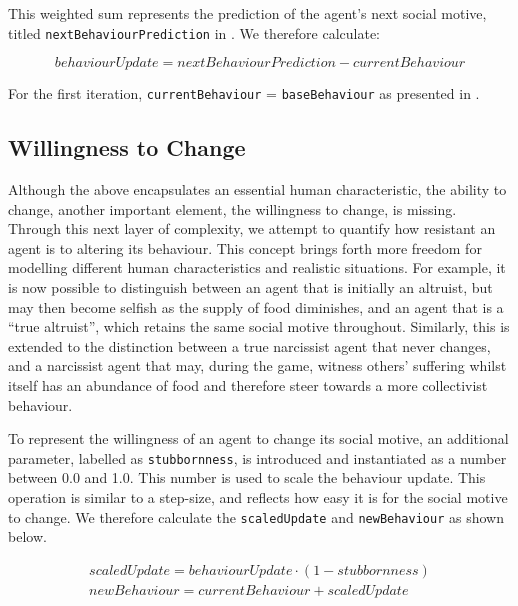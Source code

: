 This weighted sum represents the prediction of the agent's next social motive, titled \texttt{nextBehaviourPrediction} in . We therefore calculate:

\begin{equation}
    \mathit{behaviourUpdate = nextBehaviourPrediction - currentBehaviour}
\end{equation}


For the first iteration, \texttt{currentBehaviour} = \texttt{baseBehaviour} as presented in .

\subsection{Willingness to Change}
Although the above encapsulates an essential human characteristic, the ability to change, another important element, the willingness to change, is missing. Through this next layer of complexity, we attempt to quantify how resistant an agent is to altering its behaviour. This concept brings forth more freedom for modelling different human characteristics and realistic situations. For example, it is now possible to distinguish between an agent that is initially an altruist, but may then become selfish as the supply of food diminishes, and an agent that is a “true altruist”, which retains the same social motive throughout. Similarly, this is extended to the distinction between a true narcissist agent that never changes, and a narcissist agent that may, during the game, witness others' suffering whilst itself has an abundance of food and therefore steer towards a more collectivist behaviour.

To represent the willingness of an agent to change its social motive, an additional parameter, labelled as \texttt{stubbornness}, is introduced and instantiated as a number between 0.0 and 1.0. This number is used to scale the behaviour update. This operation is similar to a step-size, and reflects how easy it is for the social motive to change. We therefore calculate the \texttt{scaledUpdate} and \texttt{newBehaviour} as shown below.


\begin{equation}
    \begin{gathered}
    \mathit{scaledUpdate = behaviourUpdate \cdot (1-stubbornness)} \\
    \mathit{newBehaviour = currentBehaviour + scaledUpdate}
    \end{gathered}
\end{equation}


